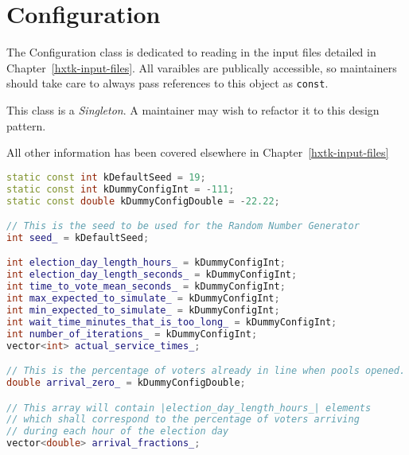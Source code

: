 %

\chapter{Configuration}

The Configuration class is dedicated to reading in the input files detailed in Chapter~\ref{hxtk-input-files}. All varaibles are publically accessible, so maintainers should take care to always pass references to this object as \texttt{const}.

This class is a \emph{Singleton}. A maintainer may wish to refactor it to this design pattern.

All other information has been covered elsewhere in Chapter~\ref{hxtk-input-files}

\begin{lstlisting}[language=C++]
static const int kDefaultSeed = 19;
static const int kDummyConfigInt = -111;
static const double kDummyConfigDouble = -22.22;

// This is the seed to be used for the Random Number Generator
int seed_ = kDefaultSeed;

int election_day_length_hours_ = kDummyConfigInt;
int election_day_length_seconds_ = kDummyConfigInt;
int time_to_vote_mean_seconds_ = kDummyConfigInt;
int max_expected_to_simulate_ = kDummyConfigInt;
int min_expected_to_simulate_ = kDummyConfigInt;
int wait_time_minutes_that_is_too_long_ = kDummyConfigInt;
int number_of_iterations_ = kDummyConfigInt;
vector<int> actual_service_times_;

// This is the percentage of voters already in line when pools opened.
double arrival_zero_ = kDummyConfigDouble;

// This array will contain |election_day_length_hours_| elements
// which shall correspond to the percentage of voters arriving
// during each hour of the election day
vector<double> arrival_fractions_;
\end{lstlisting}
